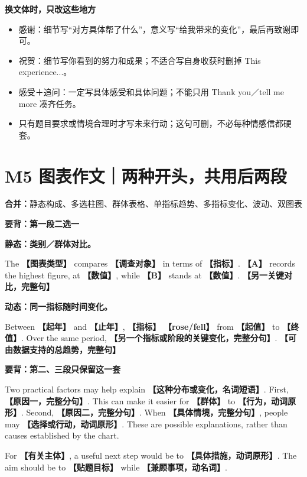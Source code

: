 \documentclass[11pt,a4paper,fontset=macnew]{ctexart}
\newenvironment{example}{\begingroup\fontsize{10.5}{14}\selectfont\setlength{\parskip}{4pt}}{\par\endgroup}
\begin{document}
\par\vspace{5pt}\noindent\textbf{换文体时，只改这些地方}\par\nopagebreak
{\small\begin{itemize}
\item 感谢：细节写“对方具体帮了什么”，意义写“给我带来的变化”，最后再致谢即可。
\item 祝贺：细节写你看到的努力和成果；不适合写自身收获时删掉 This experience...。
\item 感受＋追问：一定写具体感受和具体问题；不能只用 Thank you／tell me more 凑齐任务。
\item 只有题目要求或情境合理时才写未来行动；这句可删，不必每种情感信都硬套。
\end{itemize}}
\clearpage\section*{M5 图表作文｜两种开头，共用后两段}
{\small\textbf{合并：}静态构成、多选柱图、群体表格、单指标趋势、多指标变化、波动、双图表}\par
\par\vspace{5pt}\noindent\textbf{要背：第一段二选一}\par\nopagebreak
\begin{example}\textbf{静态：类别／群体对比。}\par
The \textbf{【图表类型】} compares \textbf{【调查对象】} in terms of \textbf{【指标】}. \textbf{【A】} records the highest figure, at \textbf{【数值】}, while \textbf{【B】} stands at \textbf{【数值】}. \textbf{【另一关键对比，完整句】}

\textbf{动态：同一指标随时间变化。}\par
Between \textbf{【起年】} and \textbf{【止年】}, \textbf{【指标】} \textbf{【rose/fell】} from \textbf{【起值】} to \textbf{【终值】}. Over the same period, \textbf{【另一个指标或阶段的关键变化，完整分句】}. \textbf{【可由数据支持的总趋势，完整句】}

\end{example}
\par\vspace{5pt}\noindent\textbf{要背：第二、三段只保留这一套}\par\nopagebreak
\begin{example}
Two practical factors may help explain \textbf{【这种分布或变化，名词短语】}. First, \textbf{【原因一，完整分句】}. This can make it easier for \textbf{【群体】} to \textbf{【行为，动词原形】}. Second, \textbf{【原因二，完整分句】}. When \textbf{【具体情境，完整分句】}, people may \textbf{【选择或行动，动词原形】}. These are possible explanations, rather than causes established by the chart.

For \textbf{【有关主体】}, a useful next step would be to \textbf{【具体措施，动词原形】}. The aim should be to \textbf{【贴题目标】} while \textbf{【兼顾事项，动名词】}.

\end{example}
\end{document}
